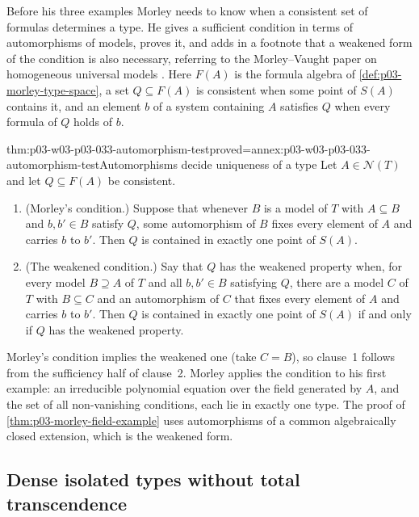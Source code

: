 Before his three examples Morley needs to know when a consistent set of
formulas determines a type. He gives a sufficient condition in terms of
automorphisms of models, proves it, and adds in a footnote that a
weakened form of the condition is also necessary, referring to the
Morley--Vaught paper on homogeneous universal models
\cite[p.~523 and n.~14]{Morley1965}. Here \(F(A)\) is the formula algebra
of \cref{def:p03-morley-type-space}, a set \(Q\subseteq F(A)\) is
consistent when some point of \(S(A)\) contains it, and an element
\(b\) of a system containing \(A\) satisfies \(Q\) when every formula of
\(Q\) holds of \(b\).

\begin{hbtheorem}{thm:p03-w03-p03-033-automorphism-test}{proved=annex:p03-w03-p03-033-automorphism-test}{Automorphisms decide uniqueness of a type}
Let \(A\in\mathcal N(T)\) and let \(Q\subseteq F(A)\) be consistent.
\begin{enumerate}
\item (Morley's condition.) Suppose that whenever \(B\) is a model of
\(T\) with \(A\subseteq B\) and \(b,b'\in B\) satisfy \(Q\), some
automorphism of \(B\) fixes every element of \(A\) and carries \(b\) to
\(b'\). Then \(Q\) is contained in exactly one point of \(S(A)\).
\item (The weakened condition.) Say that \(Q\) has the weakened property
when, for every model \(B\supseteq A\) of \(T\) and all
\(b,b'\in B\) satisfying \(Q\), there are a model \(C\) of \(T\) with
\(B\subseteq C\) and an automorphism of \(C\) that fixes every element
of \(A\) and carries \(b\) to \(b'\). Then \(Q\) is contained in exactly
one point of \(S(A)\) if and only if \(Q\) has the weakened property.
\end{enumerate}
\end{hbtheorem}

Morley's condition implies the weakened one (take \(C=B\)), so clause~1
follows from the sufficiency half of clause~2. Morley applies the
condition to his first example: an irreducible polynomial equation over the
field generated by \(A\), and the set of all non-vanishing conditions,
each lie in exactly one type. The proof of
\cref{thm:p03-morley-field-example} uses automorphisms of a common
algebraically closed extension, which is the weakened form.

\subsection{Dense isolated types without total transcendence}
\label{sec:p03-w03-p03-033-density}

